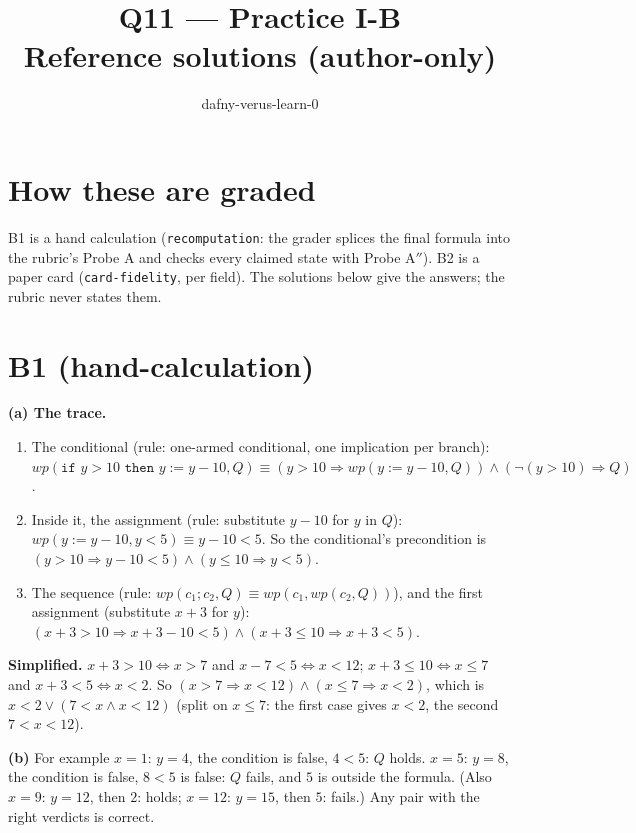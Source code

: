 \documentclass[11pt]{article}
\title{Q11 --- Practice I-B \\ \large Reference solutions (author-only)}
\author{dafny-verus-learn-0}
\date{}
\begin{document}
\maketitle
\sloppy

\section*{How these are graded}
B1 is a hand calculation (\texttt{recomputation}: the grader splices the final
formula into the rubric's Probe A and checks every claimed state with
Probe A$''$). B2 is a paper card (\texttt{card-fidelity}, per field). The
solutions below give the answers; the rubric never states them.

\section*{B1 (hand-calculation)}

\textbf{(a) The trace.}
\begin{enumerate}
\item The conditional (rule: one-armed conditional, one implication per
  branch): $\mathit{wp}(\texttt{if } y > 10 \texttt{ then } y := y - 10, Q)
  \equiv (y > 10 \Rightarrow \mathit{wp}(y := y - 10, Q)) \wedge (\neg (y > 10)
  \Rightarrow Q)$.
\item Inside it, the assignment (rule: substitute $y - 10$ for $y$ in $Q$):
  $\mathit{wp}(y := y - 10, y < 5) \equiv y - 10 < 5$. So the conditional's
  precondition is $(y > 10 \Rightarrow y - 10 < 5) \wedge (y \le 10
  \Rightarrow y < 5)$.
\item The sequence (rule: $\mathit{wp}(c_1; c_2, Q) \equiv
  \mathit{wp}(c_1, \mathit{wp}(c_2, Q))$), and the first assignment
  (substitute $x + 3$ for $y$): $(x + 3 > 10 \Rightarrow x + 3 - 10 < 5)
  \wedge (x + 3 \le 10 \Rightarrow x + 3 < 5)$.
\end{enumerate}
\textbf{Simplified.} $x + 3 > 10 \iff x > 7$ and $x - 7 < 5 \iff x < 12$;
$x + 3 \le 10 \iff x \le 7$ and $x + 3 < 5 \iff x < 2$. So
$(x > 7 \Rightarrow x < 12) \wedge (x \le 7 \Rightarrow x < 2)$, which is
$x < 2 \vee (7 < x \wedge x < 12)$ (split on $x \le 7$: the first case gives
$x < 2$, the second $7 < x < 12$).

\textbf{(b)} For example $x = 1$: $y = 4$, the condition is false, $4 < 5$:
$Q$ holds. $x = 5$: $y = 8$, the condition is false, $8 < 5$ is false: $Q$
fails, and $5$ is outside the formula. (Also $x = 9$: $y = 12$, then $2$:
holds; $x = 12$: $y = 15$, then $5$: fails.) Any pair with the right
verdicts is correct.
\end{document}
